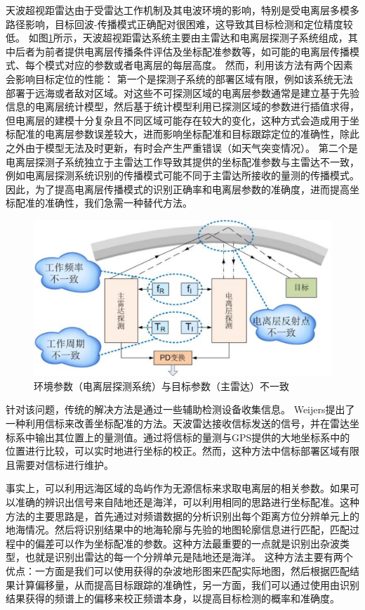 天波超视距雷达由于受雷达工作机制及其电波环境的影响，特别是受电离层多模多路径影响，目标回波-传播模式正确配对很困难，这导致其目标检测和定位精度较低。
如图\ref{fig:pdproblem}所示，天波超视距雷达系统主要由主雷达和电离层探测子系统组成，其中后者为前者提供电离层传播条件评估及坐标配准参数等，如可能的电离层传播模式、每个模式对应的参数或者电离层的每层高度。
然而，利用该方法有两个因素会影响目标定位的性能：
第一个是探测子系统的部署区域有限，例如该系统无法部署于远海或者敌对区域。对这些不可探测区域的电离层参数通常是建立基于先验信息的电离层统计模型，然后基于统计模型利用已探测区域的参数进行插值求得，但电离层的建模十分复杂且不同区域可能存在较大的变化，这种方式会造成用于坐标配准的电离层参数误差较大，进而影响坐标配准和目标跟踪定位的准确性，除此之外由于模型无法及时更新，有时会产生严重错误（如天气突变情况）。
第二个是电离层探测子系统独立于主雷达工作导致其提供的坐标配准参数与主雷达不一致，例如电离层探测系统识别的传播模式可能不同于主雷达所接收的量测的传播模式。因此，为了提高电离层传播模式的识别正确率和电离层参数的准确度，进而提高坐标配准的准确性，我们急需一种替代方法。

\begin{figure}[hbt]
	\centering
	\includegraphics[width=13.5cm]{figures/introduction/pdproblem}
	\caption{环境参数（电离层探测系统）与目标参数（主雷达）不一致}
	\label{fig:pdproblem}
\end{figure}

针对该问题，传统的解决方法是通过一些辅助检测设备收集信息。
Weijers提出了一种利用信标来改善坐标配准的方法。天波雷达接收信标发送的信号，并在雷达坐标系中输出其位置上的量测值。通过将信标的量测与GPS提供的大地坐标系中的位置进行比较，可以实时地进行坐标的校正。然而，这种方法中信标部署区域有限且需要对信标进行维护。

事实上，可以利用远海区域的岛屿作为无源信标来求取电离层的相关参数。如果可以准确的辨识出信号来自陆地还是海洋，可以利用相同的思路进行坐标配准。这种方法的主要思路是，首先通过对频谱数据的分析识别出每个距离方位分辨单元上的地海情况。然后将识别结果中的地海轮廓与先验的地图轮廓信息进行匹配，匹配过程中的偏差可以作为坐标配准的参数。这种方法最重要的一点就是识别出杂波类型，也就是识别出雷达的每一个分辨单元是陆地还是海洋。
这种方法主要有两个优点：一方面是我们可以使用获得的杂波地形图来匹配实际地图，然后根据匹配结果计算偏移量，从而提高目标跟踪的准确性，另一方面，我们可以通过使用由识别结果获得的频谱上的偏移来校正频谱本身，以提高目标检测的概率和准确度。

